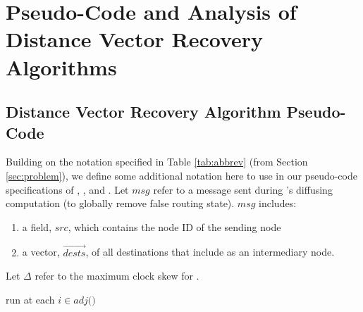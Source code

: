 
\chapter{Pseudo-Code and Analysis of Distance Vector Recovery Algorithms}
\label{ch:appendix-rollback}

\section{Distance Vector Recovery Algorithm Pseudo-Code}
\label{sec:appendix-rollback-code}

Building on the notation specified in Table \ref{tab:abbrev} (from Section \ref{sec:problem}), we define some additional notation here to use in our pseudo-code 
specifications of \seconds, \purges, and \cprs.
Let $msg$ refer to a message sent during \purges's diffusing computation (to globally remove false routing state). $msg$ includes:
\begin{enumerate}

	\item a field, $src$, which contains the node ID of the sending node 
	\item a vector, $\overrightarrow{dests}$, of all destinations that include \bad as an intermediary node. 

\end{enumerate}
Let $\Delta$ refer to the maximum clock skew for \cprs. %


\begin{algorithm}
\caption{\second  run at each $i \in adj($\bads$)$} 
\label{alg:second}

\begin{algorithmic}[1]

	\ENDIF
\ENDFOR
	\ENDIF

\end{algorithmic}
\end{algorithm}




